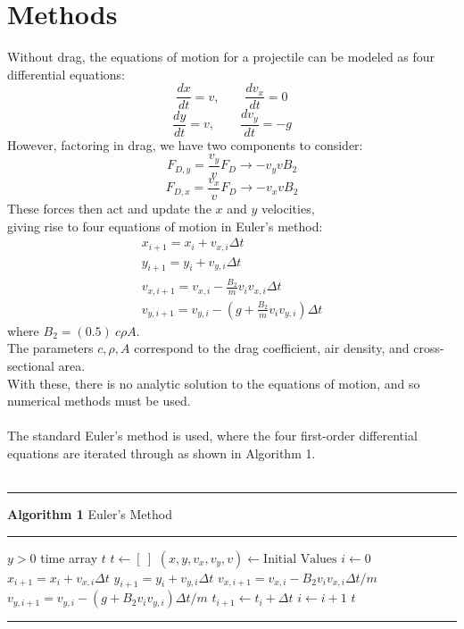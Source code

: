 \documentclass{article}
\begin{document}
	\section{Methods}
	Without drag, the equations of motion for a projectile can be modeled as four differential equations:
	\[\frac{dx}{dt} = v, \qquad \frac{dv_{x}}{dt} = 0\]
	\[\frac{dy}{dt} = v, \qquad \frac{dv_{y}}{dt} = -g\]
	However, factoring in drag, we have two components to consider:
			\[F_{D,y} = \frac{v_{y}}{v} F_{D} \to -v_{y}vB_{2}\]
			\[F_{D,x} = \frac{v_{x}}{v} F_{D} \to -v_{x}vB_{2}\]
	These forces then act and update the $x$ and $y$ velocities, \\
	giving rise to four equations of motion in Euler's method: 
	\begin{eqnarray}
		x_{i+1}=x_i+v_{x,i}\Delta t\\
		y_{i+1}=y_i+v_{y,i}\Delta t\\
		v_{x,i+1} = v_{x,i}-\frac{B_2}{m}v_iv_{x,i}\Delta t\\
		v_{y,i+1}=v_{y,i}-\left(g+\frac{B_2}{m}v_iv_{y,i}\right)\Delta t
	\end{eqnarray}
	\indent where $B_2= (0.5)~c\rho A$.
	\\\indent The parameters $c, \rho, A$ correspond to the drag coefficient, air density, and cross-sectional area. 
	\\ \indent With these, there is no analytic solution to the equations of motion, and so numerical methods must be used.
	\\\\\indent The standard Euler's method is used, where the four first-order differential equations are iterated through as shown in Algorithm 1.
	\\\\
		\begin{minipage}{1\linewidth}
		\rule{\linewidth}{0.5pt}
		\textbf{Algorithm 1} Euler's Method
	
		\vspace{-0.5em}
		\rule{\linewidth}{0.5pt}
		
		\begin{algorithmic}
			\Require $y>0$
			\Ensure time array $t$
			\State $t\gets[~]$
			\State $(x, y, v_x, v_y,v) \gets \text{Initial Values}$
			\State $i\gets0$
			\Repeat
				\State $x_{i+1}=x_i+v_{x,i}\Delta t$
				\State $y_{i+1}=y_i+v_{y,i}\Delta t$
				\State $v_{x,i+1} = v_{x,i}-B_2v_iv_{x,i}\Delta t/m$
				\State $v_{y,i+1}=v_{y,i}-\left(g+B_2v_iv_{y,i}\right)\Delta t/m$
				\State $t_{i+1}\gets t_i+\Delta t$
				\State $i\gets i+1$
			\State \Return $t$
		\end{algorithmic}		
		\rule{\linewidth}{0.5pt}
		\vspace{0.25mm}
	\end{minipage}
\end{document}
